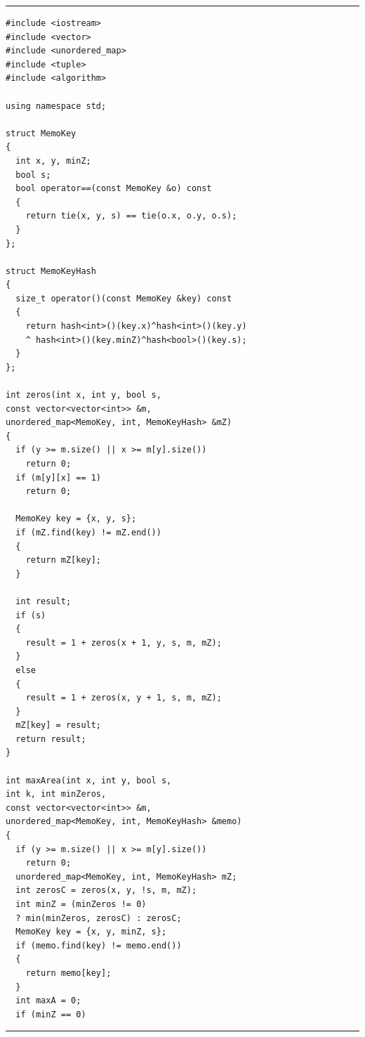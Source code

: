\documentclass[a4paper, 12pt]{article}
\begin{document}
\strut\hspace{1cm}
\begin{minipage}[t]{7cm}
  \hrule\begin{lstlisting}
#include <iostream>
#include <vector>
#include <unordered_map>
#include <tuple>
#include <algorithm>

using namespace std;

struct MemoKey
{
  int x, y, minZ;
  bool s;
  bool operator==(const MemoKey &o) const
  {
    return tie(x, y, s) == tie(o.x, o.y, o.s);
  }
};

struct MemoKeyHash
{
  size_t operator()(const MemoKey &key) const
  {
    return hash<int>()(key.x)^hash<int>()(key.y)
    ^ hash<int>()(key.minZ)^hash<bool>()(key.s);
  }
};

int zeros(int x, int y, bool s,
const vector<vector<int>> &m,
unordered_map<MemoKey, int, MemoKeyHash> &mZ)
{
  if (y >= m.size() || x >= m[y].size())
    return 0;
  if (m[y][x] == 1)
    return 0;

  MemoKey key = {x, y, s};
  if (mZ.find(key) != mZ.end())
  {
    return mZ[key];
  }

  int result;
  if (s)
  {
    result = 1 + zeros(x + 1, y, s, m, mZ);
  }
  else
  {
    result = 1 + zeros(x, y + 1, s, m, mZ);
  }
  mZ[key] = result;
  return result;
}

int maxArea(int x, int y, bool s,
int k, int minZeros,
const vector<vector<int>> &m,
unordered_map<MemoKey, int, MemoKeyHash> &memo)
{
  if (y >= m.size() || x >= m[y].size())
    return 0;
  unordered_map<MemoKey, int, MemoKeyHash> mZ;
  int zerosC = zeros(x, y, !s, m, mZ);
  int minZ = (minZeros != 0)
  ? min(minZeros, zerosC) : zerosC;
  MemoKey key = {x, y, minZ, s};
  if (memo.find(key) != memo.end())
  {
    return memo[key];
  }
  int maxA = 0;
  if (minZ == 0)
\end{lstlisting}\hrule
\end{minipage}
\hfill
\end{document}
